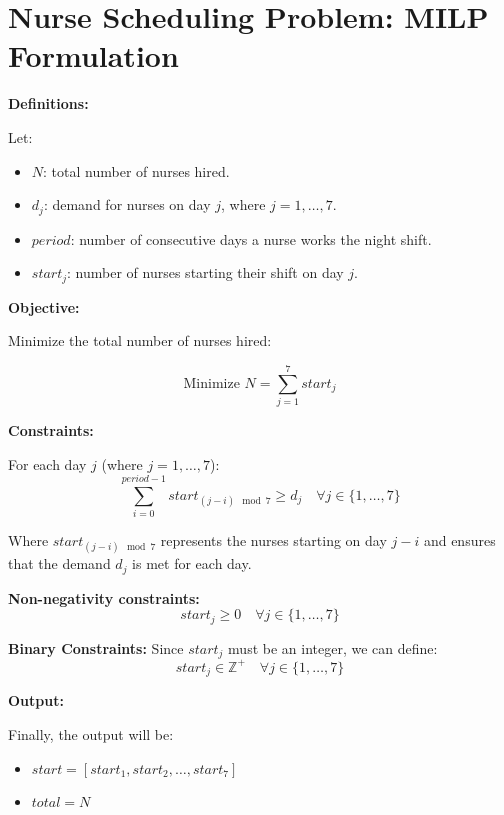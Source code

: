\documentclass{article}
\begin{document}
\section*{Nurse Scheduling Problem: MILP Formulation}

\textbf{Definitions:}

Let:
\begin{itemize}
    \item $N$: total number of nurses hired.
    \item $d_j$: demand for nurses on day $j$, where $j = 1, \ldots, 7$.
    \item $period$: number of consecutive days a nurse works the night shift.
    \item $start_j$: number of nurses starting their shift on day $j$.
\end{itemize}

\textbf{Objective:}

Minimize the total number of nurses hired:

\[
\text{Minimize } N = \sum_{j=1}^{7} start_j
\]

\textbf{Constraints:}

For each day \( j \) (where \( j = 1, \ldots, 7 \)):
\[
\sum_{i=0}^{period-1} start_{(j-i) \mod 7} \geq d_j \quad \forall j \in \{1,\ldots,7\}
\]

Where \( start_{(j-i) \mod 7} \) represents the nurses starting on day \( j-i \) and ensures that the demand \( d_j \) is met for each day.

\textbf{Non-negativity constraints:}
\[
start_j \geq 0 \quad \forall j \in \{1,\ldots,7\}
\]

\textbf{Binary Constraints:}
Since \( start_j \) must be an integer, we can define:
\[
start_j \in \mathbb{Z}^{+} \quad \forall j \in \{1,\ldots,7\}
\]

\textbf{Output:}

Finally, the output will be:
\begin{itemize}
    \item $start = [start_1, start_2, \ldots, start_7]$
    \item $total = N$
\end{itemize}
\end{document}
